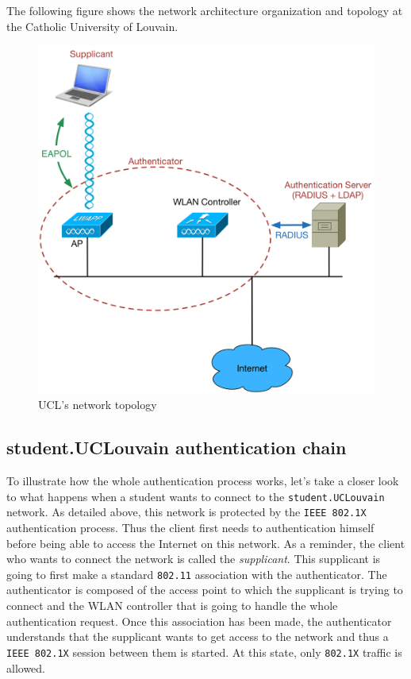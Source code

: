 The following figure shows the network architecture organization and topology at the Catholic University of Louvain.
\begin{figure}[H]
	\includegraphics[width=.9\linewidth]{Pictures/Chapter2/topology.png}
	\caption{UCL's network topology}
\end{figure}


\subsection{student.UCLouvain authentication chain}
To illustrate how the whole authentication process works, let's take a closer look to what happens when a student wants to connect to the \texttt{student.UCLouvain} network.
As detailed above, this network is protected by the \texttt{IEEE 802.1X} authentication process. Thus the client first needs to authentication himself before being able to access the Internet on this network.
As a reminder, the client who wants to connect the network is called the \textit{supplicant}. This supplicant is going to first make a standard \texttt{802.11} association with the authenticator. The authenticator is composed of the access point to which the supplicant is trying to connect and the WLAN controller that is going to handle the whole authentication request. Once this association has been made, the authenticator understands that the supplicant wants to get access to the network and thus a \texttt{IEEE 802.1X} session between them is started. At this state, only \texttt{802.1X} traffic is allowed. 


